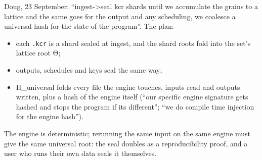 Doug, 23 September: “ingest->seal kcr shards until we accumulate the grains to a lattice and the same goes for the output and any scheduling, we coalesce a universal hash for the state of the program”. The plan:

\begin{itemize}
\item each \texttt{.\allowbreak{}kcr} is a shard sealed at ingest, and the shard roots fold into the set's lattice root Θ;
\item outputs, schedules and keys seal the same way;
\item H\_\allowbreak{}universal folds every file the engine touches, inputs read and outputs written, plus a hash of the engine itself (“our specific engine signature gets hashed and stops the program if its different”; “we do compile time injection for the engine hash”).
\end{itemize}

The engine is deterministic; rerunning the same input on the same engine must give the same universal root: the seal doubles as a reproducibility proof, and a user who runs their own data seals it themselves.
